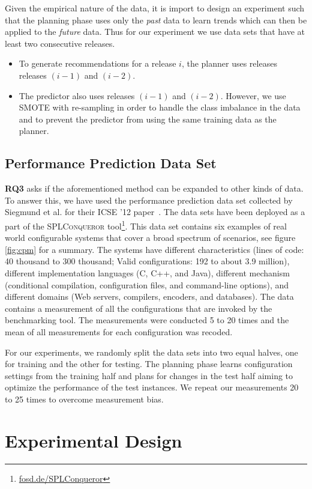 \documentclass[conference]{IEEEtran}
\newcommand{\kw}[1]{\textit{#1}}
\begin{document}
{Given the empirical nature of the data, it is import to design an experiment such that the planning phase uses only the \kw{past} data to learn trends which can then be applied to the \kw{future} data. Thus for our experiment we use data sets that have at least two consecutive releases. 
\begin{itemize}
\item To generate recommendations for a release $i$, the planner uses releases releases $(i-1)$ and $(i-2)$.
\item The predictor also uses releases $(i-1)$ and $(i-2)$. However, we use SMOTE with re-sampling in order to handle the class imbalance in the data and to prevent the predictor from using the same training data as the planner.
\end{itemize}

\subsection{Performance Prediction Data Set}

{\bfseries RQ3} asks if the aforementioned method can be expanded to other kinds of data. To answer this, we have used the performance prediction data set collected by Siegmund et al. for their ICSE '12 paper~\cite{sven12}. The data sets have been deployed as a part of the \textsc{SPLConqueror} tool\footnote{\url{fosd.de/SPLConqueror}}. This data set contains six examples of real world configurable systems that cover a broad spectrum of scenarios, see figure \ref{fig:cpm} for a summary. The systems have different characteristics (lines of code: 40 thousand to 300 thousand; Valid configurations: 192 to about 3.9 million), different implementation languages (C, C++, and Java), different mechanism (conditional compilation, configuration files, and command-line options), and different domains (Web servers, compilers, encoders, and databases). The data contains a measurement of all the configurations that are invoked by the benchmarking tool. The measurements were conducted 5 to 20 times and the mean of all measurements for each configuration was recoded.

For our experiments, we randomly split the data sets into two equal halves, one for training and the other for testing. The planning phase learns configuration settings from the training half and plans for changes in the test half aiming to optimize the performance of the test instances. We repeat our measurements 20 to 25 times to overcome measurement bias.
\section{Experimental Design}

}
\end{document}
